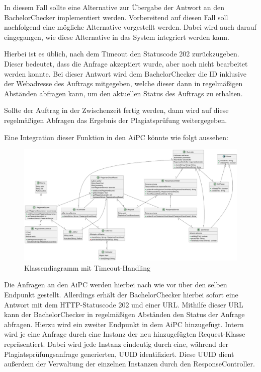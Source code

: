 In diesem Fall sollte eine Alternative zur Übergabe der Antwort an den BachelorChecker implementiert werden.
Vorbereitend auf diesen Fall soll nachfolgend eine mögliche Alternative vorgestellt werden.
Dabei wird auch darauf eingegangen, wie diese Alternative in das System integriert werden kann.

Hierbei ist es üblich, nach dem Timeout den Statuscode 202 zurückzugeben.
Dieser bedeutet, dass die Anfrage akzeptiert wurde, aber noch nicht bearbeitet werden konnte\autocite{mozilla}.
Bei dieser Antwort wird dem BachelorChecker die ID inklusive der Webadresse des Auftrags mitgegeben,
welche dieser dann in regelmäßigen Abständen abfragen kann, um den aktuellen Status des Auftrags zu erhalten.

Sollte der Auftrag in der Zwischenzeit fertig werden, dann wird auf diese regelmäßigen Abfragen das Ergebnis
der Plagiatsprüfung weitergegeben.

Eine Integration dieser Funktion in den \ac{AiPC} könnte wie folgt aussehen:
\begin{figure}[H]
    \centering
    \includegraphics[width=\textwidth]{images/diagrams/Klassendiagramm_HTTP_202}
    \caption{Klassendiagramm mit Timeout-Handling}
    \label{fig:klassendiagramm-mit-timeout-handling}
\end{figure}

Die Anfragen an den \ac{AiPC} werden hierbei nach wie vor über den selben Endpunkt gestellt.
Allerdings erhält der BachelorChecker hierbei sofort eine Antwort mit dem \ac{HTTP}-Statuscode 202 und einer \ac{URL}.
Mithilfe dieser \ac{URL} kann der BachelorChecker in regelmäßigen Abständen den Status der Anfrage abfragen.
Hierzu wird ein zweiter Endpunkt in dem \ac{AiPC} hinzugefügt.
Intern wird je eine Anfrage durch eine Instanz der neu hinzugefügten Request-Klasse repräsentiert.
Dabei wird jede Instanz eindeutig durch eine, während der Plagiatsprüfungsanfrage generierten, \ac{UUID} identifiziert.
Diese \ac{UUID} dient außerdem der Verwaltung der einzelnen Instanzen durch den ResponseController.


